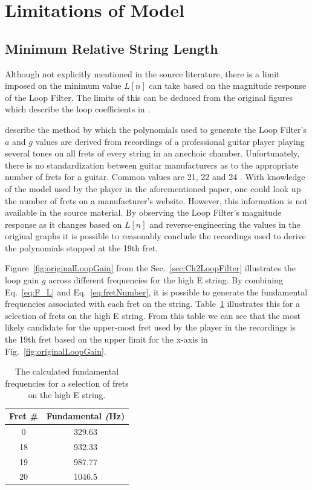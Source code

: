 \documentclass[../main.tex]{subfiles}
\begin{document}
\section{Limitations of Model}
\subsection{Minimum Relative String Length}
\label{sec:MinL}
Although not explicitly mentioned in the source literature, there is a limit imposed on the minimum value $L[n]$ can take based on the magnitude response of the Loop Filter. The limits of this can be deduced from the original figures which describe the loop coefficients in .

 describe the method by which the polynomials used to generate the Loop Filter's $a$ and $g$ values are derived from recordings of a professional guitar player playing several tones on all frets of every string in an anechoic chamber. Unfortunately, there is no standardization between guitar manufacturers as to the appropriate number of frets for a guitar. Common values are 21, 22 and 24 . With knowledge of the model used by the player in the aforementioned paper, one could look up the number of frets on a manufacturer's website. However, this information is not available in the source material. By observing the Loop Filter's magnitude response as it changes based on $L[n]$ and reverse-engineering the values in the original graphs it is possible to reasonably conclude the recordings used to derive the polynomials stopped at the 19th fret.

Figure~\ref{fig:originalLoopGain} from the Sec.~\ref{sec:Ch2LoopFilter} illustrates the loop gain $g$ across different frequencies for the high E string. By combining Eq.~\ref{eq:F_L} and Eq.~\ref{eq:fretNumber}, it is possible to generate the fundamental frequencies associated with each fret on the string. Table~\ref{tab:eStringFrets} illustrates this for a selection of frets on the high E string. From this table we can see that the most likely candidate for the upper-most fret used by the player in the recordings is the 19th fret based on the upper limit for the x-axis in Fig.~\ref{fig:originalLoopGain}.

\begin{table}[h]
\centering
\begin{tabular}{|c| c|} 
 \hline
 \textbf{Fret \#} & \textbf{Fundamental} \emph(Hz) \\ [0.5ex] 
 \hline
 0 & 329.63\\
 18 & 932.33\\
 19 & 987.77\\
 20 & 1046.5\\
 \hline
\end{tabular}
\caption{The calculated fundamental frequencies for a selection of frets on the high E string.}
\label{tab:eStringFrets}
\end{table}
\end{document}
